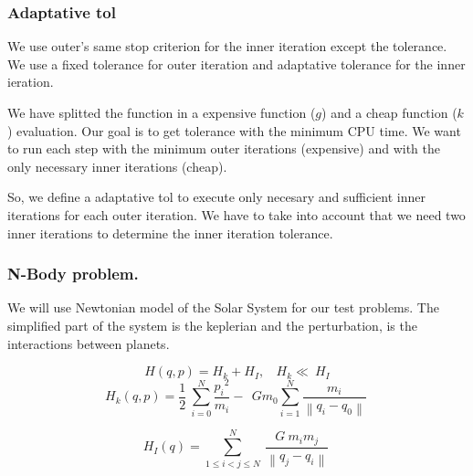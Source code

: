 
\subsubsection*{Adaptative tol}
We use outer's same stop criterion for the inner iteration except the tolerance. We use a fixed tolerance for outer iteration and adaptative tolerance for the inner ieration.

We have splitted the function in a expensive function ($g$) and a cheap function ($k$) evaluation. Our goal is to get tolerance with the minimum CPU time. We want to run each step with the minimum outer iterations (expensive) and with the only necessary inner iterations (cheap). 

So, we define a adaptative tol to execute only necesary and sufficient inner iterations for each outer iteration. We have to take into account that we need two inner iterations to determine the inner iteration tolerance.\\

\subsubsection*{N-Body problem.}

We will use Newtonian model of the Solar System for our test problems. The simplified part of the system is the keplerian and the perturbation, is the interactions between planets.

\[H\left(q,p\right)=H_k+H_I,\ \ \ \ H_k\ll \ H_I\] 
\begin{equation}
H_k(q,p)=\frac{1}{2}\ \sum^N_{i=0}{\frac{{p_i}^2}{m_i}}-\ \ Gm_0\sum^N_{i=1}{\frac{m_i}{\left\|q_i-q_0\right\|}}\  
\label{eq:h1}
\end{equation}

\begin{equation}
H_I(q)=\sum^N_{1\le i<j\le N}{\ \frac{G\ m_im_j}{\left\|q_j-q_i\right\|}}\   
\label{eq:h2}
\end{equation}

